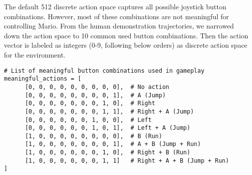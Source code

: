 \documentclass{article}
\begin{document}
The default 512 discrete action space captures all possible joystick button 
combinations. However, most of these combinations are not meaningful for 
controlling Mario. From the human demonstration trajectories, we narrowed down 
the action space to 10 common used button combinations.
Then the action vector is labeled as integers (0-9, following below orders)
as discrete action space for the environment.

\begin{verbatim}
# List of meaningful button combinations used in gameplay
meaningful_actions = [
      [0, 0, 0, 0, 0, 0, 0, 0, 0],  # No action
      [0, 0, 0, 0, 0, 0, 0, 0, 1],  # A (Jump)
      [0, 0, 0, 0, 0, 0, 0, 1, 0],  # Right
      [0, 0, 0, 0, 0, 0, 0, 1, 1],  # Right + A (Jump)
      [0, 0, 0, 0, 0, 0, 1, 0, 0],  # Left
      [0, 0, 0, 0, 0, 0, 1, 0, 1],  # Left + A (Jump)
      [1, 0, 0, 0, 0, 0, 0, 0, 0],  # B (Run)
      [1, 0, 0, 0, 0, 0, 0, 0, 1],  # A + B (Jump + Run)
      [1, 0, 0, 0, 0, 0, 0, 1, 0],  # Right + B (Run)
      [1, 0, 0, 0, 0, 0, 0, 1, 1]   # Right + A + B (Jump + Run)
]
\end{verbatim}
\end{document}
